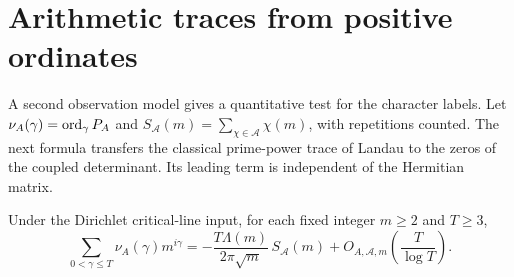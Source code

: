 \section{Arithmetic traces from positive ordinates}
\label{sec:prime-trace}

A second observation model gives a quantitative test for the character labels. Let $\nu_A(\gamma)=\operatorname{ord}_\gamma P_A$ and $S_{\mathcal A}(m)=\sum_{\chi\in\mathcal A}\chi(m)$, with repetitions counted. The next formula transfers the classical prime-power trace of Landau \cite{gonek} to the zeros of the coupled determinant. Its leading term is independent of the Hermitian matrix.

\begin{theorem}\label{thm:landau}
Under the Dirichlet critical-line input, for each fixed integer $m\ge2$ and $T\ge3$,
\[
 \sum_{0<\gamma\le T}\nu_A(\gamma)m^{i\gamma}
 =-\frac{T\Lambda(m)}{2\pi\sqrt m}\,S_{\mathcal A}(m)
  +O_{A,\mathcal A,m}\!\left(\frac{T}{\log T}\right).
\]
\end{theorem}
